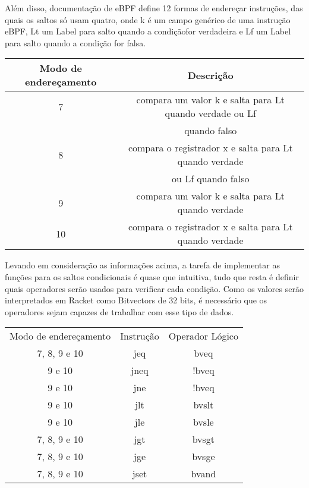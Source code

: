 \documentclass[paper=a4, fontsize=12pt]{article}
\theoremstyle{definition}
\begin{document}
Além disso, documentação de eBPF define 12 formas de endereçar instruções, das quais os saltos
só usam quatro, onde k é um campo genérico de uma instrução eBPF, Lt um Label para salto quando a condiçãofor verdadeira
e Lf um Label para salto quando a condição for falsa.  

\begin{center}
\begin{tabular}{ |c|c| }
  \hline
  Modo de endereçamento & Descrição\\
  \hline
  7 & compara um valor k e salta para Lt quando verdade ou Lf\\
  & quando falso\\
  \hline
  8 & compara o registrador x e salta para Lt quando verdade\\ 
  & ou Lf quando falso\\
  \hline
  9 & compara um valor k e salta para Lt quando verdade\\
  \hline
  10 & compara o registrador x e salta para Lt quando verdade\\
  \hline
\end{tabular}
\end{center}

Levando em consideração as informações acima, a tarefa de implementar as funções para os saltos condicionais é quase
que intuitiva, tudo que resta é definir quais operadores serão usados para verificar cada condição. Como os valores
serão interpretados em Racket como Bitvectors de 32 bits, é necessário que os operadores sejam capazes de trabalhar
com esse tipo de dados.

\begin{center}
\begin{tabular}{ c c c }
  Modo de endereçamento & Instrução & Operador Lógico\\
  7, 8, 9 e 10          & jeq       & bveq\\
  9 e 10                & jneq      & !bveq\\
  9 e 10                & jne       & !bveq\\
  9 e 10                & jlt       & bvslt\\
  9 e 10                & jle       & bvsle\\
  7, 8, 9 e 10          & jgt       & bvsgt\\
  7, 8, 9 e 10          & jge       & bvsge\\
  7, 8, 9 e 10          & jset      & bvand\\
\end{tabular}
\end{center}
\end{document}
